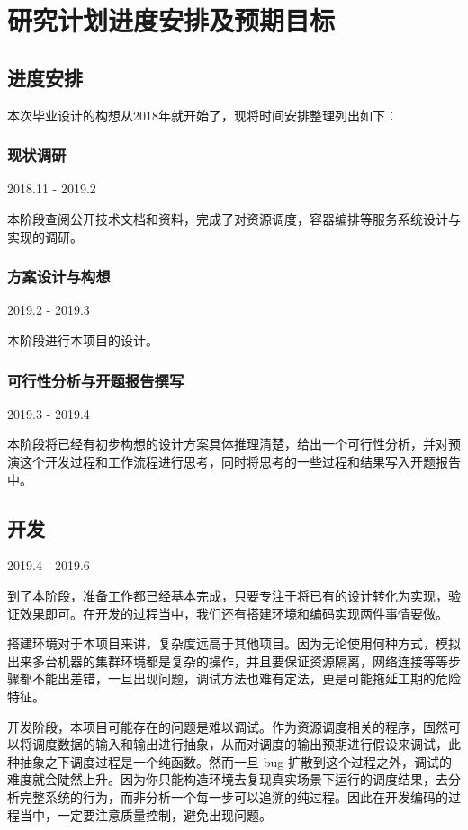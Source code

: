 \section{研究计划进度安排及预期目标}

\subsection{进度安排}

本次毕业设计的构想从2018年就开始了，现将时间安排整理列出如下：

\subsubsection*{现状调研}

2018.11 - 2019.2

本阶段查阅公开技术文档和资料，完成了对资源调度，容器编排等服务系统设计与实现的调研。

\subsubsection*{方案设计与构想}

2019.2 - 2019.3

本阶段进行本项目的设计。

\subsubsection*{可行性分析与开题报告撰写}

2019.3 - 2019.4

本阶段将已经有初步构想的设计方案具体推理清楚，给出一个可行性分析，并对预演这个开发过程和工作流程进行思考，同时将思考的一些过程和结果写入开题报告中。

\subsection*{开发}

2019.4 - 2019.6

到了本阶段，准备工作都已经基本完成，只要专注于将已有的设计转化为实现，验证效果即可。在开发的过程当中，我们还有搭建环境和编码实现两件事情要做。

搭建环境对于本项目来讲，复杂度远高于其他项目。因为无论使用何种方式，模拟出来多台机器的集群环境都是复杂的操作，并且要保证资源隔离，网络连接等等步骤都不能出差错，一旦出现问题，调试方法也难有定法，更是可能拖延工期的危险特征。

开发阶段，本项目可能存在的问题是难以调试。作为资源调度相关的程序，固然可以将调度数据的输入和输出进行抽象，从而对调度的输出预期进行假设来调试，此种抽象之下调度过程是一个纯函数。然而一旦 bug 扩散到这个过程之外，调试的难度就会陡然上升。因为你只能构造环境去复现真实场景下运行的调度结果，去分析完整系统的行为，而非分析一个每一步可以追溯的纯过程。因此在开发编码的过程当中，一定要注意质量控制，避免出现问题。

